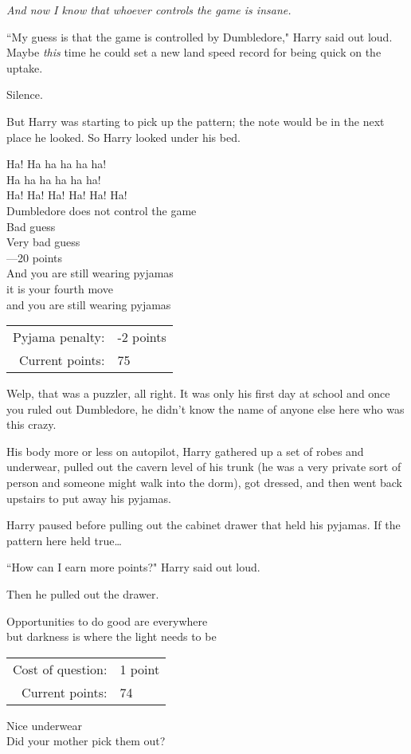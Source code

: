 \emph{And now I know that whoever controls the game is insane.}

``My guess is that the game is controlled by Dumbledore," Harry said out loud. Maybe \emph{this} time he could set a new land speed record for being quick on the uptake.

Silence.

But Harry was starting to pick up the pattern; the note would be in the next place he looked. So Harry looked under his bed.
\begin{writtenNote}
Ha! Ha ha ha ha ha!\\
Ha ha ha ha ha ha!\\
Ha! Ha! Ha! Ha! Ha! Ha!\\
Dumbledore does not control the game\\
Bad guess\\
Very bad guess\\
—20 points\\
And you are still wearing pyjamas\\
it is your fourth move\\
and you are still wearing pyjamas

\begin{tabular}{rl}
Pyjama penalty: & -2 points\\
Current points: & 75
\end{tabular}
\end{writtenNote}

Welp, that was a puzzler, all right. It was only his first day at school and once you ruled out Dumbledore, he didn't know the name of anyone else here who was this crazy.

His body more or less on autopilot, Harry gathered up a set of robes and underwear, pulled out the cavern level of his trunk (he was a very private sort of person and someone might walk into the dorm), got dressed, and then went back upstairs to put away his pyjamas.

Harry paused before pulling out the cabinet drawer that held his pyjamas. If the pattern here held true…

``How can I earn more points?" Harry said out loud.

Then he pulled out the drawer.
\begin{writtenNote}
Opportunities to do good are everywhere\\
but darkness is where the light needs to be

\begin{tabular}{rl}
Cost of question: & 1 point\\
Current points: & 74
\end{tabular}

Nice underwear\\
Did your mother pick them out?
\end{writtenNote}

